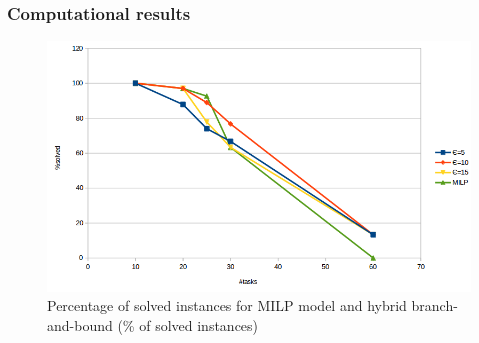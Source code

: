 \begin{frame}
  \frametitle{Computational results}
  \begin{figure}[!htb]
    \centering
    \includegraphics[width=0.9\linewidth]{figures/BB_solved.png}
    \caption{Percentage of solved instances for MILP model and hybrid 
      branch-and-bound (\% of solved instances)}
  \end{figure}
\vfill
\end{frame}
